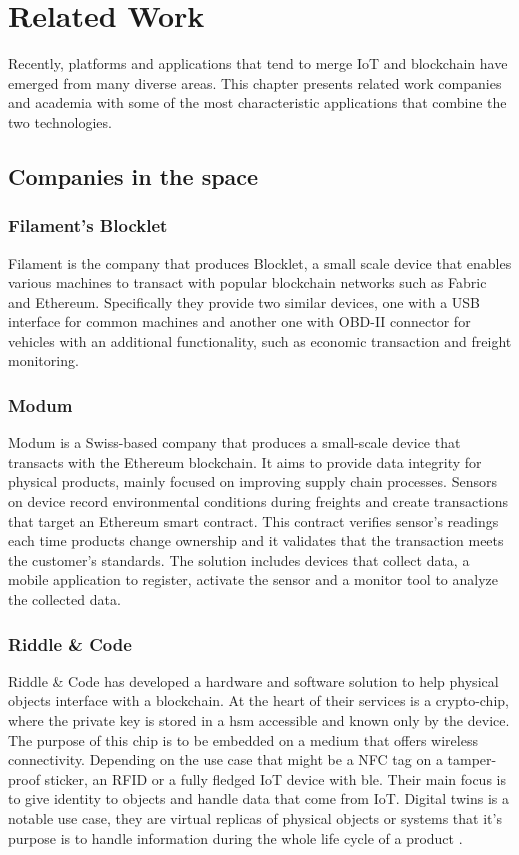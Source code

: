 \chapter{Related Work}
Recently, platforms and applications that tend to merge IoT and blockchain have emerged from many diverse areas. This chapter presents related work companies and academia with some of the most characteristic applications that combine the two technologies. 
\section{Companies in the space}
\subsection{Filament's Blocklet}
Filament is the company that produces Blocklet\cite{filament}, a small scale device that enables various machines to transact with popular blockchain networks such as Fabric and Ethereum. Specifically they provide two similar devices, one with a USB interface for common machines and another one with OBD-II connector for vehicles with an additional functionality, such as economic transaction and freight monitoring. 
\subsection{Modum}
Modum \cite{modum} is a Swiss-based company that produces a small-scale device that transacts with the Ethereum blockchain. It aims to provide data integrity for physical products, mainly focused on improving supply chain processes. Sensors on device record environmental conditions during freights and create transactions that target an Ethereum smart contract. This contract verifies sensor's readings each time products change ownership and it validates that the transaction meets the customer's standards. The solution includes devices that collect data, a mobile application to register, activate the sensor and a monitor tool to analyze the collected data. 
\subsection{Riddle \& Code}
Riddle \& Code \cite{riddle_and_code} has developed a hardware and software solution to help physical objects interface with a blockchain. At the heart of their services is a crypto-chip, where the private key is stored in a \acrshort{hsm} accessible and known only by the device. The purpose of this chip is to be embedded on a medium that offers wireless connectivity. Depending on the use case that might be a NFC tag on a tamper-proof sticker, an RFID or a fully fledged IoT device with \acrshort{ble}. Their main focus is to give identity to objects and handle data that come from IoT. Digital twins is a notable use case, they are virtual replicas of physical objects or systems that it's purpose is to handle information during the whole life cycle of a product \cite{sallaba2019iot}.

